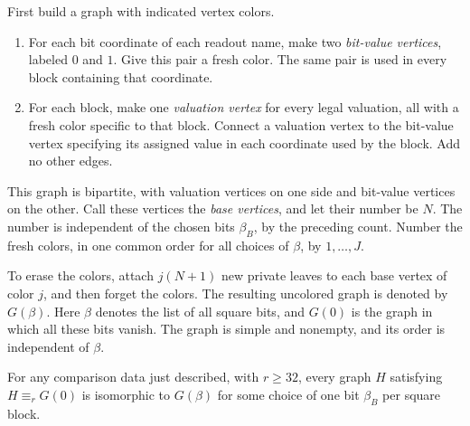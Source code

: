 First build a graph with indicated vertex colors.
\begin{enumerate}[label=\arabic*.]
\item For each bit coordinate of each readout name, make two
\emph{bit-value vertices}, labeled $0$ and $1$. Give this pair a
fresh color. The same pair is used in every block containing that
coordinate.
\item For each block, make one \emph{valuation vertex} for every
legal valuation, all with a fresh color specific to that block.
Connect a valuation vertex to the bit-value vertex specifying its
assigned value in each coordinate used by the block. Add no other
edges.
\end{enumerate}
This graph is bipartite, with valuation vertices on one side and
bit-value vertices on the other. Call these vertices the
\emph{base vertices}, and let their number be $N$. The number is
independent of the chosen bits $\beta_B$, by the preceding count.
Number the fresh colors, in one common order for all choices of
$\beta$, by $1,\ldots,J$.

To erase the colors, attach $j(N+1)$ new private leaves to each base
vertex of color $j$, and then forget the colors. The resulting
uncolored graph is denoted by $G(\beta)$. Here $\beta$ denotes the
list of all square bits, and $G(0)$ is the graph in which all these
bits vanish. The graph is simple and nonempty, and its order is
independent of $\beta$.

\begin{proposition}
\label{prop:mate}
For any comparison data just described, with $r\ge 32$, every graph
$H$ satisfying $H\equiv_r G(0)$ is isomorphic to $G(\beta)$ for
some choice of one bit $\beta_B$ per square block.
\end{proposition}

